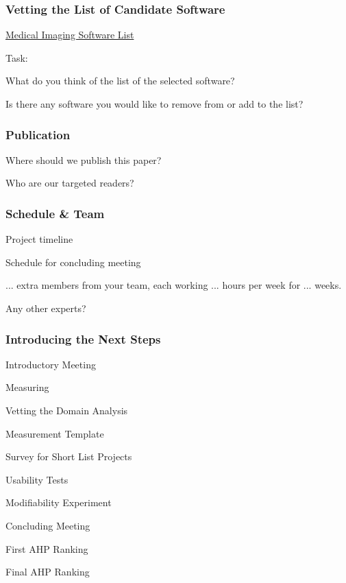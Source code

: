 \documentclass[t,12pt,numbers,fleqn]{beamer}
\begin{document}

\begin{frame}
\frametitle{Vetting the List of Candidate Software}

\href{https://docs.google.com/spreadsheets/d/122wU0v3ZtvDcqy8C4zKJ89kU-8fXAbo3Mzn6vcVXOi0/edit?usp=sharing}{Medical Imaging Software List}

Task:
\bi
\item What do you think of the list of the selected software?
\item Is there any software you would like to remove from or add to the list?
\ei

\end{frame}


\begin{frame}
\frametitle{Publication}

\bi
\item Where should we publish this paper?
\item Who are our targeted readers?
\ei

\end{frame}


\begin{frame}
\frametitle{Schedule \& Team}

\bi
\item Project timeline
\item Schedule for concluding meeting
\item ... extra members from your team, each working ... hours per week for ...
weeks.
\item Any other experts?
\ei

\end{frame}


\begin{frame}
\frametitle{Introducing the Next Steps} 

\bi
\item Introductory Meeting
\item Measuring
\bi
\item Vetting the Domain Analysis
\item Measurement Template
\item Survey for Short List Projects
\item Usability Tests
\item Modifiability Experiment
\ei
\item Concluding Meeting
\bi
\item First AHP Ranking
\item Final AHP Ranking
\ei
\ei

\end{frame}

\end{document}
